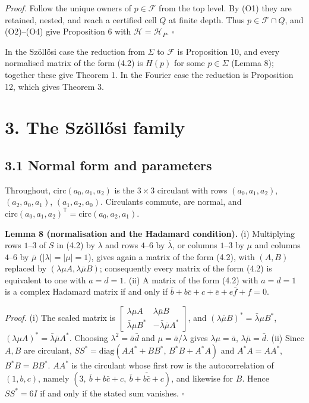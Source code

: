 \documentclass[
  11pt,
]{article}
\begin{document}
\emph{Proof.} Follow the unique owners of \(p\in\mathcal F\) from the
top level. By (O1) they are retained, nested, and reach a certified cell
\(Q\) at finite depth. Thus \(p\in\mathcal F\cap Q\), and (O2)--(O4)
give Proposition 6 with \(\mathcal H=\mathcal H_P\). \(\square\)

In the Szöllősi case the reduction from \(\Sigma\) to \(\mathcal F\) is
Proposition 10, and every normalised matrix of the form (4.2) is
\(H(p)\) for some \(p\in\Sigma\) (Lemma 8); together these give Theorem
1. In the Fourier case the reduction is Proposition 12, which gives
Theorem 3.

\section{3. The Szöllősi family}\label{the-szuxf6llux151si-family}

\subsection{3.1 Normal form and
parameters}\label{normal-form-and-parameters}

Throughout, \(\mathrm{circ}(a_0,a_1,a_2)\) is the \(3\times3\) circulant
with rows \((a_0,a_1,a_2)\), \((a_2,a_0,a_1)\), \((a_1,a_2,a_0)\).
Circulants commute, are normal, and
\(\mathrm{circ}(a_0,a_1,a_2)^{\mathsf T}=\mathrm{circ}(a_0,a_2,a_1)\).

\textbf{Lemma 8 (normalisation and the Hadamard condition).} (i)
Multiplying rows \(1\)--\(3\) of \(S\) in (4.2) by \(\lambda\) and rows
\(4\)--\(6\) by \(\bar\lambda\), or columns \(1\)--\(3\) by \(\mu\) and
columns \(4\)--\(6\) by \(\bar\mu\) (\(|\lambda|=|\mu|=1\)), gives again
a matrix of the form (4.2), with \((A,B)\) replaced by
\((\lambda\mu A,\lambda\bar\mu B)\); consequently every matrix of the
form (4.2) is equivalent to one with \(a=d=1\). (ii) A matrix of the
form (4.2) with \(a=d=1\) is a complex Hadamard matrix if and only if
\(\bar b+b\bar c+c+\bar e+e\bar f+f=0\).

\emph{Proof.} (i) The scaled matrix is
\(\begin{bmatrix}\lambda\mu A&\lambda\bar\mu B\\ \bar\lambda\mu B^*&-\bar\lambda\bar\mu A^*\end{bmatrix}\),
and \((\lambda\bar\mu B)^*=\bar\lambda\mu B^*\),
\((\lambda\mu A)^*=\bar\lambda\bar\mu A^*\). Choosing
\(\lambda^2=\bar a\bar d\) and \(\mu=\bar a/\lambda\) gives
\(\lambda\mu=\bar a\), \(\lambda\bar\mu=\bar d\). (ii) Since \(A,B\) are
circulant, \(SS^*=\mathrm{diag}(AA^*+BB^*,\,B^*B+A^*A)\) and
\(A^*A=AA^*\), \(B^*B=BB^*\). \(AA^*\) is the circulant whose first row
is the autocorrelation of \((1,b,c)\), namely
\((3,\ \bar b+b\bar c+c,\ \overline{\bar b+b\bar c+c})\), and likewise
for \(B\). Hence \(SS^*=6I\) if and only if the stated sum vanishes.
\(\square\)
\end{document}
